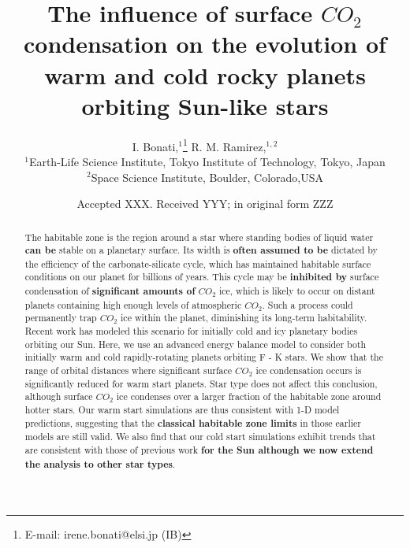 \documentclass[fleqn,usenatbib]{mnras}
\title[$CO_{\mathrm{2}}$ condensation on rocky planets]{The influence of surface $CO_{\mathrm{2}}$ condensation on the evolution of warm and cold rocky planets orbiting Sun-like stars}
\author[I. Bonati and R. Ramirez]{
I. Bonati,$^{1}$\thanks{E-mail: irene.bonati@elsi.jp (IB)}
R. M. Ramirez,$^{1,2}$
\\
$^{1}$Earth-Life Science Institute, Tokyo Institute of Technology, Tokyo, Japan\\
$^{2}$Space Science Institute, Boulder, Colorado,USA\\
}
\date{Accepted XXX. Received YYY; in original form ZZZ}
\providecommand{\DIFadd}[1]{{\bf #1}} %
\providecommand{\DIFdel}[1]{} %
\providecommand{\DIFaddbegin}{} %
\providecommand{\DIFaddend}{} %
\providecommand{\DIFdelbegin}{} %
\providecommand{\DIFdelend}{} %
\newcommand{\DIFscaledelfig}{0.5}
\newlength{\DIFdelgraphicswidth} %
\newlength{\DIFdelgraphicsheight} %
\newcommand{\DIFaddincludegraphics}[2][]{{\color{blue}\fbox{\DIFOincludegraphics[#1]{#2}}}} %
\newcommand{\DIFdelincludegraphics}[2][]{%
\sbox{\DIFdelgraphicsbox}{\DIFOincludegraphics[#1]{#2}}%
\settoboxwidth{\DIFdelgraphicswidth}{\DIFdelgraphicsbox} %
\settoboxtotalheight{\DIFdelgraphicsheight}{\DIFdelgraphicsbox} %
\scalebox{\DIFscaledelfig}{%
\parbox[b]{\DIFdelgraphicswidth}{\usebox{\DIFdelgraphicsbox}\\[-\baselineskip] \rule{\DIFdelgraphicswidth}{0em}}\llap{\resizebox{\DIFdelgraphicswidth}{\DIFdelgraphicsheight}{%
\setlength{\unitlength}{\DIFdelgraphicswidth}%
\begin{picture}(1,1)%
\thicklines\linethickness{2pt} %
{\color[rgb]{1,0,0}\put(0,0){\framebox(1,1){}}}%
{\color[rgb]{1,0,0}\put(0,0){\line( 1,1){1}}}%
{\color[rgb]{1,0,0}\put(0,1){\line(1,-1){1}}}%
\end{picture}%
}\hspace*{3pt}}} %
} %
\DeclareRobustCommand{\DIFaddbegin}{\DIFOaddbegin \let\includegraphics\DIFaddincludegraphics} %
\DeclareRobustCommand{\DIFaddend}{\DIFOaddend \let\includegraphics\DIFOincludegraphics} %
\DeclareRobustCommand{\DIFdelbegin}{\DIFOdelbegin \let\includegraphics\DIFdelincludegraphics} %
\DeclareRobustCommand{\DIFdelend}{\DIFOaddend \let\includegraphics\DIFOincludegraphics} %
\begin{document}
\newcommand{\add}[1]{\textcolor{greenblue}{#1}}
\newcommand{\irene}[1]{\textcolor{greenblue}{\textit{(Irene: #1)}}}
\newcommand{\ramses}[1]{\textcolor{greenish}{\textit{(Ramses: #1)}}}
\newcommand{\todo}[1]{\textcolor{red}{#1}}
\newcommand{\textb}[1]{\textcolor{greenblue}{#1}}
\newcommand{\textg}[1]{\textcolor{greenish}{#1}}
\label{firstpage}
\pagerange{\pageref{firstpage}--\pageref{lastpage}}
\maketitle

\begin{abstract}
The habitable zone is the region around a star where standing bodies of liquid water \DIFdelbegin \DIFdel{are }\DIFdelend \DIFaddbegin \DIFadd{can be }\DIFaddend stable on a planetary surface. Its width is \DIFaddbegin \DIFadd{often assumed to be }\DIFaddend dictated by the efficiency of the carbonate-silicate cycle, which has maintained habitable surface conditions on our planet for billions of years. This cycle may be \DIFdelbegin \DIFdel{severely inhibited by significant }\DIFdelend \DIFaddbegin \DIFadd{inhibited by }\DIFaddend surface condensation of \DIFaddbegin \DIFadd{significant amounts of }\DIFaddend $CO_{\mathrm{2}}$ ice, which is likely to occur on distant planets containing high enough levels of atmospheric $CO_{\mathrm{2}}$. Such a process could permanently trap $CO_{\mathrm{2}}$ ice within the planet, diminishing its long-term habitability. Recent work has modeled this scenario for initially cold and icy planetary bodies orbiting our Sun. Here, we use an advanced energy balance model to consider both initially warm and cold rapidly-rotating planets orbiting F - K stars. We show that the range of orbital distances where significant surface $CO_{\mathrm{2}}$ ice condensation occurs is significantly reduced for warm start planets. Star type does not affect this conclusion, although surface $CO_{\mathrm{2}}$ ice condenses over a larger fraction of the habitable zone around hotter stars. Our warm start simulations are thus consistent with 1-D model predictions, suggesting that the \DIFdelbegin \DIFdel{size of the classical $CO_{\mathrm{2}}$-$H_{\mathrm{2}}O$ habitable zone }\DIFdelend \DIFaddbegin \DIFadd{classical habitable zone limits }\DIFaddend in those earlier models are still valid. We also find that our cold start simulations exhibit trends that are consistent with those of previous work \DIFaddbegin \DIFadd{for the Sun although we now extend the analysis to other star types}\DIFaddend .    
\end{abstract}
\end{document}

